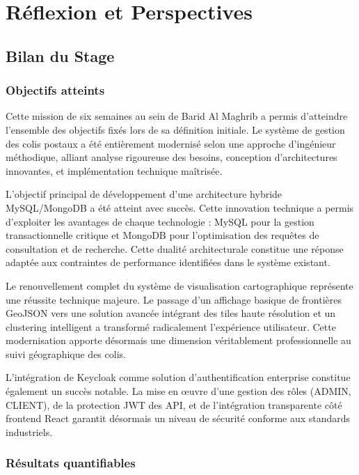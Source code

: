 \chapter{Réflexion et Perspectives}

\section{Bilan du Stage}

\subsection{Objectifs atteints}

Cette mission de six semaines au sein de Barid Al Maghrib a permis d'atteindre l'ensemble des objectifs fixés lors de sa définition initiale. Le système de gestion des colis postaux a été entièrement modernisé selon une approche d'ingénieur méthodique, alliant analyse rigoureuse des besoins, conception d'architectures innovantes, et implémentation technique maîtrisée.

L'objectif principal de développement d'une architecture hybride MySQL/MongoDB a été atteint avec succès. Cette innovation technique a permis d'exploiter les avantages de chaque technologie : MySQL pour la gestion transactionnelle critique et MongoDB pour l'optimisation des requêtes de consultation et de recherche. Cette dualité architecturale constitue une réponse adaptée aux contraintes de performance identifiées dans le système existant.

Le renouvellement complet du système de visualisation cartographique représente une réussite technique majeure. Le passage d'un affichage basique de frontières GeoJSON vers une solution avancée intégrant des tiles haute résolution et un clustering intelligent a transformé radicalement l'expérience utilisateur. Cette modernisation apporte désormais une dimension véritablement professionnelle au suivi géographique des colis.

L'intégration de Keycloak comme solution d'authentification enterprise constitue également un succès notable. La mise en œuvre d'une gestion des rôles (ADMIN, CLIENT), de la protection JWT des API, et de l'intégration transparente côté frontend React garantit désormais un niveau de sécurité conforme aux standards industriels.
\subsection{Résultats quantifiables}

